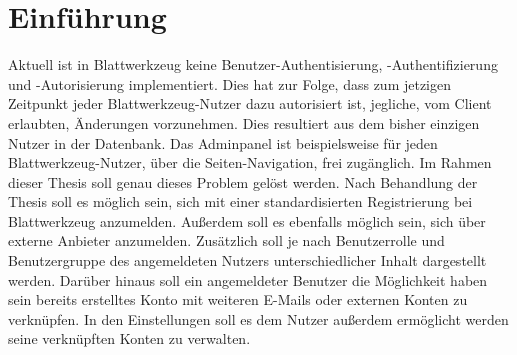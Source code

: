 \section{Einführung}
\label{sec:introduction}
Aktuell ist in Blattwerkzeug keine Benutzer-Authentisierung, -Authentifizierung und -Autorisierung implementiert. Dies hat zur Folge, dass  zum jetzigen Zeitpunkt jeder Blattwerkzeug-Nutzer dazu autorisiert ist, jegliche, vom Client erlaubten, Änderungen vorzunehmen. Dies resultiert aus dem bisher einzigen Nutzer in der Datenbank. Das Adminpanel ist beispielsweise für jeden Blattwerkzeug-Nutzer, über die Seiten-Navigation, frei zugänglich. Im Rahmen dieser Thesis soll genau dieses Problem gelöst werden. Nach Behandlung der Thesis soll es möglich sein, sich mit einer standardisierten Registrierung bei Blattwerkzeug anzumelden. Außerdem soll es ebenfalls möglich sein, sich über externe Anbieter anzumelden. Zusätzlich soll je nach Benutzerrolle und Benutzergruppe des angemeldeten Nutzers unterschiedlicher Inhalt dargestellt werden. Darüber hinaus soll ein angemeldeter Benutzer die Möglichkeit haben sein bereits erstelltes Konto mit weiteren E-Mails oder externen Konten zu verknüpfen. In den Einstellungen soll es dem Nutzer außerdem ermöglicht werden seine verknüpften Konten zu verwalten.

